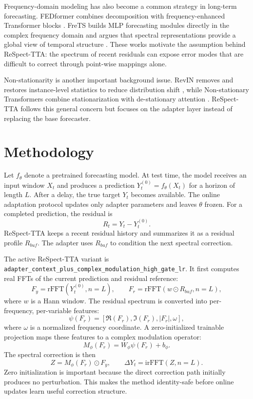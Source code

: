 \documentclass[10pt]{article}
\begin{document}
Frequency-domain modeling has also become a common strategy in long-term forecasting. FEDformer combines decomposition with frequency-enhanced Transformer blocks \cite{zhou2022fedformer}. FreTS builds MLP forecasting modules directly in the complex frequency domain and argues that spectral representations provide a global view of temporal structure \cite{yi2023frets}. These works motivate the assumption behind ReSpect-TTA: the spectrum of recent residuals can expose error modes that are difficult to correct through point-wise mappings alone.

Non-stationarity is another important background issue. RevIN removes and restores instance-level statistics to reduce distribution shift \cite{kim2022revin}, while Non-stationary Transformers combine stationarization with de-stationary attention \cite{liu2022nonstationary}. ReSpect-TTA follows this general concern but focuses on the adapter layer instead of replacing the base forecaster.

\section{Methodology}

Let \(f_\theta\) denote a pretrained forecasting model. At test time, the model receives an input window \(X_t\) and produces a prediction \(Y_t^{(0)} = f_\theta(X_t)\) for a horizon of length \(L\). After a delay, the true target \(Y_t\) becomes available. The online adaptation protocol updates only adapter parameters and leaves \(\theta\) frozen. For a completed prediction, the residual is
\[
R_t = Y_t - Y_t^{(0)}.
\]
ReSpect-TTA keeps a recent residual history and summarizes it as a residual profile \(R_{buf}\). The adapter uses \(R_{buf}\) to condition the next spectral correction.

The active ReSpect-TTA variant is \texttt{adapter\_context\_plus\_complex\_modulation\_high\_gate\_lr}. It first computes real FFTs of the current prediction and residual reference:
\[
F_y = \mathrm{rFFT}(Y_t^{(0)}, n=L), \qquad
F_r = \mathrm{rFFT}(w \odot R_{buf}, n=L),
\]
where \(w\) is a Hann window. The residual spectrum is converted into per-frequency, per-variable features:
\[
\psi(F_r) = [\Re(F_r), \Im(F_r), |F_r|, \omega],
\]
where \(\omega\) is a normalized frequency coordinate. A zero-initialized trainable projection maps these features to a complex modulation operator:
\[
M_\phi(F_r) = W_\phi \psi(F_r) + b_\phi.
\]
The spectral correction is then
\[
Z = M_\phi(F_r) \odot F_y, \qquad
\Delta Y_t = \mathrm{irFFT}(Z, n=L).
\]
Zero initialization is important because the direct correction path initially produces no perturbation. This makes the method identity-safe before online updates learn useful correction structure.
\end{document}
